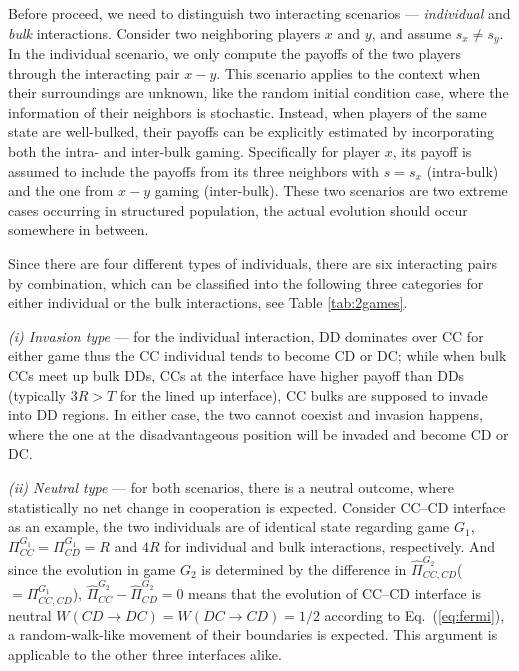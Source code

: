 \documentclass[showpacs,superscriptaddress,reprint,nofootinbib,amsmath,amssymb,aps,pre]{revtex4-1}
\begin{document}
Before proceed, we need to distinguish two interacting scenarios --- \emph{individual} and \emph{bulk} interactions. Consider two neighboring players $x$ and $y$, and assume $s_x\neq s_y$. In the individual scenario, we only compute the payoffs of the two players through the interacting pair $x-y$. This scenario applies to the context when their surroundings are unknown, like the random initial condition case, where the information of their neighbors is stochastic. Instead, when players of the same state are well-bulked, their payoffs can be explicitly estimated by incorporating both the intra- and inter-bulk gaming. Specifically for player $x$, its payoff is assumed to include the payoffs from its three neighbors with $s=s_x$ (intra-bulk) and the one from $x-y$ gaming (inter-bulk). These two scenarios are two extreme cases occurring in structured population, the actual evolution should occur somewhere in between. 

Since there are four different types of individuals, there are six interacting pairs by combination, which can be classified into the following three categories for either individual or the bulk interactions, see Table \ref{tab:2games}. 

\emph{(i) Invasion type} --- for the individual interaction, DD dominates over CC for either game thus the CC individual tends to become CD or DC; while when bulk CCs meet up bulk DDs, CCs at the interface have higher payoff than DDs (typically $3R>T$ for the lined up interface), CC bulks are supposed to invade into DD regions. In either case, the two cannot coexist and invasion happens, where the one at the disadvantageous position will be invaded and become CD or DC.

\emph{(ii) Neutral type} --- for both scenarios, there is a neutral outcome, where statistically no net change in cooperation is expected. Consider CC--CD interface as an example, the two individuals are of identical state regarding game $G_1$, $\Pi_{CC}^{G_1}\!=\!\Pi_{CD}^{G_1}\!=\!R$ and $4R$ for individual and bulk interactions, respectively. And since the evolution in game $G_2$ is determined by the difference in $\widehat{\Pi}_{CC,CD}^{G_2}$($= \Pi_{CC,CD}^{G_1}$), $\widehat{\Pi}_{CC}^{G_2}-\widehat{\Pi}_{CD}^{G_2}=0$ means that the evolution of CC--CD interface is neutral $W(CD\rightarrow DC)\!=\!W(DC\rightarrow CD)\!=\!1/2$ according to Eq.~(\ref{eq:fermi}), a random-walk-like movement of their boundaries is expected. This argument is applicable to the other three interfaces alike.
\end{document}
